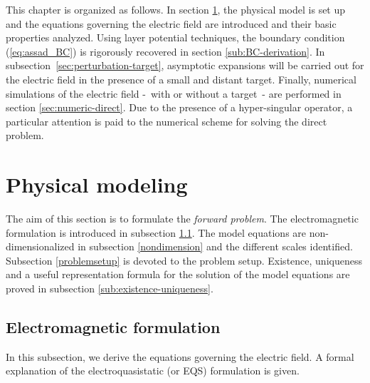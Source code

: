 This chapter is organized as follows. In section
\ref{sec:forward_problem}, the physical model is set up and the
equations governing the electric field are introduced and their
basic properties analyzed. Using layer potential techniques, the
boundary condition (\ref{eq:assad_BC}) is rigorously recovered in
section \ref{sub:BC-derivation}. In
subsection~\ref{sec:perturbation-target}, asymptotic expansions will
be carried out for the electric field in the presence of a small
and distant target.
Finally, numerical simulations of the electric field -~with or without
a target~- are performed in section
\ref{sec:numeric-direct}. Due to the presence of a hyper-singular
operator, a particular attention is paid to the numerical scheme
for solving the direct problem.



\section{Physical modeling}

\label{sec:forward_problem}

The aim of this section is to formulate the \emph{forward
problem}. The electromagnetic formulation is introduced in
subsection \ref{sub:setup}. The model equations are
non-dimensionalized in subsection \ref{nondimension} and the
different scales identified. Subsection \ref{problemsetup} is
devoted to the problem setup. Existence, uniqueness and a useful
representation formula for the solution of the model equations are
proved in subsection \ref{sub:existence-uniqueness}.


\subsection{Electromagnetic formulation}

\label{sub:setup}

In this subsection, we derive the equations governing the electric
field. A formal explanation of the electroquasistatic (or EQS)
formulation is given.

